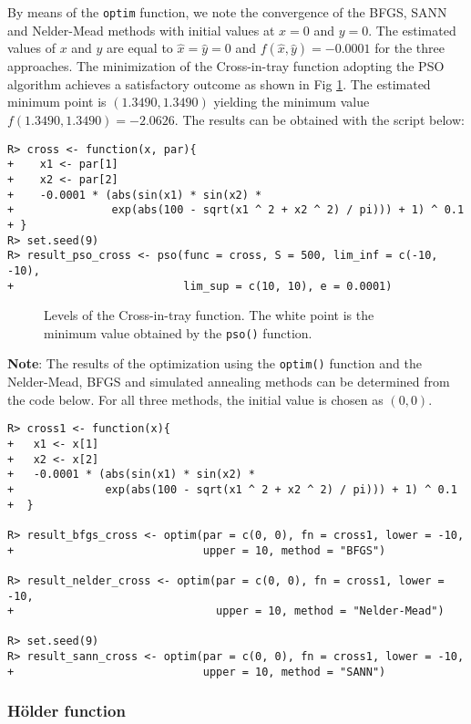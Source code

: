 \documentclass[10pt,letterpaper]{article}
\begin{document}
By means of the \texttt{optim} function, we note the convergence of the BFGS, SANN and Nelder-Mead methods with initial values at $x=0$ and $y=0$.
The estimated values of $x$ and $y$ are equal to $\widehat{x}=\widehat{y}=0$ and $f(\widehat{x},\widehat{y})=-0.0001$ for the three approaches.
The minimization of the Cross-in-tray function adopting the PSO algorithm achieves a satisfactory outcome as shown in Fig \ref{curves_cross}.
The estimated minimum point is $(1.3490,1.3490)$ yielding the minimum value $f(1.3490,1.3490) = -2.0626$.
The results can be obtained with the script below:
\begin{verbatim}
R> cross <- function(x, par){
+    x1 <- par[1]
+    x2 <- par[2]
+    -0.0001 * (abs(sin(x1) * sin(x2) *
+               exp(abs(100 - sqrt(x1 ^ 2 + x2 ^ 2) / pi))) + 1) ^ 0.1
+ }
R> set.seed(9)
R> result_pso_cross <- pso(func = cross, S = 500, lim_inf = c(-10, -10),
+                          lim_sup = c(10, 10), e = 0.0001)
\end{verbatim}

\begin{figure}[H]
\centering
\caption{Levels of the Cross-in-tray function.
The white point is the minimum value obtained by the \texttt{pso()} function.}
\label{curves_cross}
\end{figure}

\noindent
\textbf{Note}: The results of the optimization using the \texttt{optim()} function and the Nelder-Mead, BFGS and simulated annealing
methods can be determined from the code below.
For all three  methods, the initial value is chosen as $(0, 0)$.
\begin{verbatim}
R> cross1 <- function(x){
+   x1 <- x[1]
+   x2 <- x[2]
+   -0.0001 * (abs(sin(x1) * sin(x2) *
+              exp(abs(100 - sqrt(x1 ^ 2 + x2 ^ 2) / pi))) + 1) ^ 0.1
+  }

R> result_bfgs_cross <- optim(par = c(0, 0), fn = cross1, lower = -10,
+                             upper = 10, method = "BFGS")

R> result_nelder_cross <- optim(par = c(0, 0), fn = cross1, lower = -10,
+                               upper = 10, method = "Nelder-Mead")

R> set.seed(9)
R> result_sann_cross <- optim(par = c(0, 0), fn = cross1, lower = -10,
+                             upper = 10, method = "SANN")
\end{verbatim}

\subsubsection{H\"{o}lder function}
\end{document}
